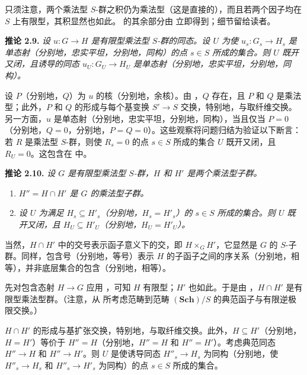只须注意，两个乘法型 \(S\)-群之积仍为乘法型（这是直接的），而且若两个因子均在 \(S\) 上有限型，其积显然也如此。 的其余部分由  立即得到；细节留给读者。

\medskip
\noindent{}\textbf{推论 2.9.}
\textit{设 \(u:G\to H\) 是有限型乘法型 \(S\)-群的同态。设 \(U\) 为使 \(u_s:G_s\to H_s\) 是单态射（分别地，忠实平坦，分别地，同构）的点 \(s\in S\) 所成的集合。则 \(U\) 既开又闭，且诱导的同态 \(u_U:G_U\to H_U\) 是单态射（分别地，忠实平坦，分别地，同构）。}

设 \(P\)（分别地，\(Q\)）为 \(u\) 的核（分别地，余核）。由 ，\(Q\) 存在，且 \(P\) 和 \(Q\) 是乘法型；此外，\(P\) 和 \(Q\) 的形成与每个基变换 \(S'\to S\) 交换，特别地，与取纤维交换。另一方面，\(u\) 是单态射（分别地，忠实平坦，分别地，同构），当且仅当 \(P=0\)（分别地，\(Q=0\)，分别地，\(P=Q=0\)）。这些观察将问题归结为验证以下断言：若 \(R\) 是乘法型 \(S\)-群，则使 \(R_s=0\) 的点 \(s\in S\) 所成的集合 \(U\) 既开又闭，且 \(R_U=0\)。这包含在  中。

\medskip
\noindent{}\textbf{推论 2.10.}
\textit{设 \(G\) 是有限型乘法型 \(S\)-群，\(H\) 和 \(H'\) 是两个乘法型子群。}
\begin{enumerate}
  \item[(a)]
  \textit{\(H''=H\cap H'\) 是 \(G\) 的乘法型子群。}

  \item[(b)]
  \textit{设 \(U\) 为满足 \(H_s\subseteq H'_s\)（分别地，\(H_s=H'_s\)）的 \(s\in S\) 所成的集合。则 \(U\) 既开又闭，且 \(H_U\subseteq H'_U\)（分别地，\(H_U=H'_U\)）。}
\end{enumerate}

当然，\(H\cap H'\) 中的交号表示函子意义下的交，即 \(H\times_GH'\)，它显然是 \(G\) 的 \(S\)-子群。同样，包含号（分别地，等号）表示 \(H\) 的子函子之间的序关系（分别地，相等），并非底层集合的包含（分别地，相等）。

先对包含态射 \(H\to G\) 应用 ，可知 \(H\) 有限型；\(H'\) 也如此。于是由 ，\(H\cap H'\) 是有限型乘法型群。（注意，从  所考虑范畴到范畴 \((\mathbf{Sch})/S\) 的典范函子与有限逆极限交换。）

\(H\cap H'\) 的形成与基扩张交换，特别地，与取纤维交换。此外，\(H\subseteq H'\)（分别地，\(H=H'\)）等价于 \(H''=H\)（分别地，\(H''=H\) 和 \(H''=H'\)）。考虑典范同态 \(H''\to H\) 和 \(H''\to H'\)。则 \(U\) 是使诱导同态 \(H''_s\to H_s\) 为同构（分别地，使 \(H''_s\to H_s\) 和 \(H''_s\to H'_s\) 为同构）的点 \(s\in S\) 所成的集合。

